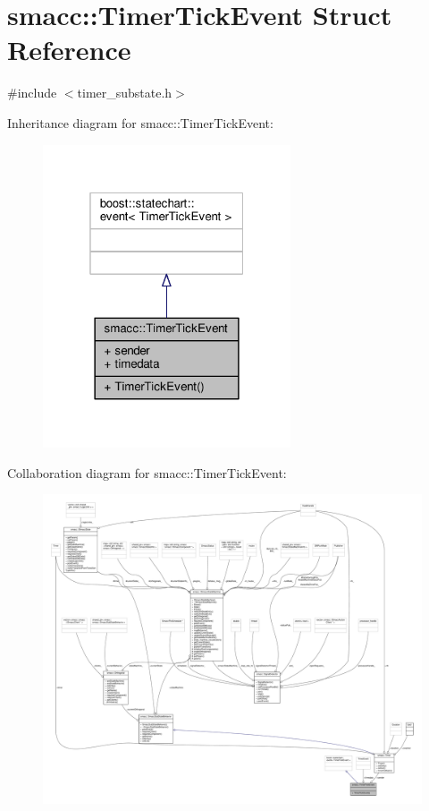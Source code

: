 \hypertarget{structsmacc_1_1TimerTickEvent}{}\section{smacc\+:\+:Timer\+Tick\+Event Struct Reference}
\label{structsmacc_1_1TimerTickEvent}


{\ttfamily \#include $<$timer\+\_\+substate.\+h$>$}



Inheritance diagram for smacc\+:\+:Timer\+Tick\+Event\+:
\nopagebreak
\begin{figure}[H]
\begin{center}
\leavevmode
\includegraphics[width=208pt]{structsmacc_1_1TimerTickEvent__inherit__graph}
\end{center}
\end{figure}


Collaboration diagram for smacc\+:\+:Timer\+Tick\+Event\+:
\nopagebreak
\begin{figure}[H]
\begin{center}
\leavevmode
\includegraphics[width=350pt]{structsmacc_1_1TimerTickEvent__coll__graph}
\end{center}
\end{figure}
